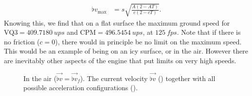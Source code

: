 \begin{align}
\label{eq:flat_v_max}
\flat{v}_{\max} &= s \sqrt{\frac{A (2 - AT)}{c (2 - cT)}}.
\end{align}
Knowing this, we find that on a flat surface the maximum ground speed for $\text{VQ3} = \qty{409.7180}{ups}$ and $\text{CPM} = \qty{496.5454}{ups}$, at $\qty{125}{fps}$. Note that if there is no friction ($c = 0$), there would in principle be no limit on the maximum speed. This would be an example of being on an icy surface, or in the air. However there are inevitably other aspects of the engine that put limits on very high speeds.


\begin{figure}[H]
	\centering
	\begin{subfigure}[t]{.5\textwidth}
		\centering
		\setlength\figureheight{5.5cm}
		\setlength\figurewidth{5.5cm}
		\caption{}
		\label{fig:delta_min_air}
	\end{subfigure}%
	\begin{subfigure}[t]{.5\textwidth}
		\centering
		\setlength\figureheight{5.5cm}
		\setlength\figurewidth{5.5cm}
		\caption{}
		\label{fig:delta_air}
	\end{subfigure}
	\begin{subfigure}[t]{.5\textwidth}
		\centering
		\setlength\figureheight{5.5cm}
		\setlength\figurewidth{5.5cm}
		\caption{}
		\label{fig:delta_opt_air}
	\end{subfigure}%
	\begin{subfigure}[t]{.5\textwidth}
		\centering
		\setlength\figureheight{5.5cm}
		\setlength\figurewidth{5.5cm}
		\caption{}
		\label{fig:delta_max_air}
	\end{subfigure}
	\caption{In the air ($\vec{\flat{v}} = \vec{\flat{v}}_f$). The current velocity $\vec{\flat{v}}$ (\yellowarrow) together with all possible acceleration configurations (\lightorangearea).}
\end{figure}

